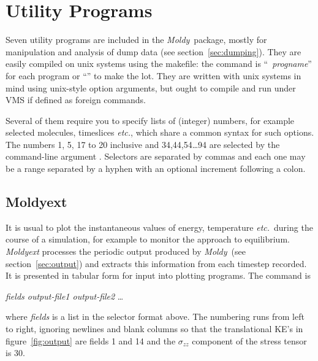 \documentclass[a4paper,twoside]{report}
\newcommand{\moldy}{\emph{Moldy}}
\newcommand{\etc}{\emph{etc.}}
\begin{document}
\chapter{Utility Programs} %
Seven utility programs are included in the \moldy\ package, mostly for
manipulation and analysis of dump data (see section~\ref{sec:dumping}).
They are easily compiled on unix systems using the makefile: the
command is ``~\emph{progname}'' for each program or
``'' to make the lot.  They are written with
unix systems in mind using unix-style option arguments, but ought to
compile and run under VMS if defined as foreign commands.

Several of them require you to specify lists of (integer) numbers, for
example selected molecules, timeslices \etc, which share a common
syntax for such options. The numbers 1, 5, 17 to 20 inclusive and
34,44,54\ldots94 are selected by the command-line argument
\mbox{}.  Selectors are separated by
commas and each one may be a range separated by a hyphen with an
optional increment following a colon.

\section{Moldyext}%
It is usual to plot the instantaneous values of energy, temperature
\etc\ during the course of a simulation, for example to monitor the
approach to equilibrium.  \emph{Moldyext} processes the periodic
output produced by \moldy\ (see section~\ref{sec:output}) and extracts
this information from each timestep recorded.  It is presented in
tabular form for input into plotting programs.  The command is
\begin{center}
 \textit{fields output-file1 output-file2} \ldots
\end{center}
where \emph{fields} is a list in the selector format above.  The
numbering runs from left to right, ignoring newlines and blank columns
so that the translational KE's in figure~\ref{fig:output} are fields 1
and 14 and the $\sigma_{zz}$ component of the stress tensor is 30.
\end{document}
